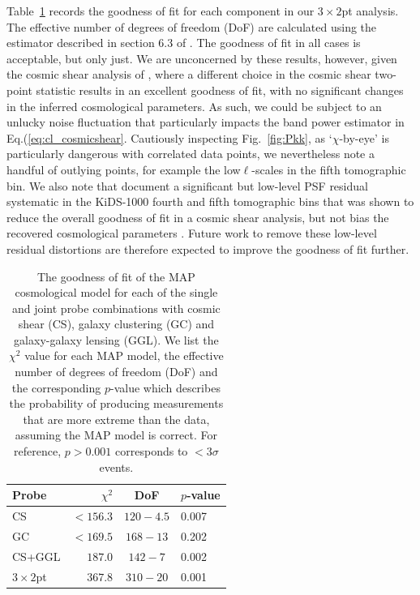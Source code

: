 Table~\ref{tab:goodness-of-fit} records the goodness of fit for each component in our $3\times2$pt analysis.  The effective number of degrees of freedom (DoF) are calculated using the estimator described in section 6.3 of \citet{joachimi/etal:inprep}.   The goodness of fit in all cases is acceptable, but only just.    We are unconcerned by these results, however, given the cosmic shear analysis of \citet{asgari/etal:inprep}, where a different choice in the cosmic shear two-point statistic results in an excellent goodness of fit, with no significant changes in the inferred cosmological parameters.    As such, we could be subject to an unlucky noise fluctuation that particularly impacts the band power estimator in Eq.(\ref{eq:cl_cosmicshear}.  Cautiously inspecting Fig.~\ref{fig:Pkk}, as `$\chi$-by-eye' is particularly dangerous with correlated data points, we nevertheless note a handful of outlying points, for example the low$\ell$-scales in the fifth tomographic bin.   We also note that \citet{giblin/etal:inprep} document a significant but low-level PSF residual systematic in the KiDS-1000 fourth and fifth tomographic bins that was shown to reduce the overall goodness of fit in a cosmic shear analysis, but not bias the recovered cosmological parameters \citep[see also the discussion in][]{amara/refregier:2008}.  Future work to remove these low-level residual distortions are therefore expected to improve the goodness of fit further.

\begin{table}
	\begin{center}
		\caption{The goodness of fit of the MAP cosmological model for each of the single and joint probe combinations with cosmic shear (CS), galaxy clustering (GC) and galaxy-galaxy lensing (GGL).   We list the $\chi^2$ value for each MAP model, the effective number of degrees of freedom (DoF) and the corresponding $p$-value which describes the probability of producing measurements that are more extreme than the data, assuming the MAP model is correct.   For reference, $p > 0.001$ corresponds to $<3\sigma$ events.}
		\label{tab:goodness-of-fit}
\begin{tabular}{lrcl}
    \toprule
    Probe             & $\chi^2$       & DoF       & $p$-value   \\
    \midrule
	CS               & $< 156.3$ & $120-4.5$ & 0.007 \\
	GC               & $< 169.5$ & $168-13$ & 0.202 \\
	CS+GGL           & $187.0$ & $142-7$ & 0.002 \\
	$3\times2$pt            & $367.8$ & $310-20$ & 0.001 \\

    \bottomrule
\end{tabular}
	\end{center}
\end{table}



